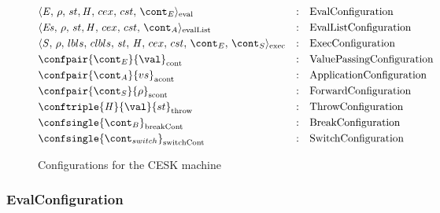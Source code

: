 \documentclass{article}
\begin{document}
\newcommand{\breakconf}[1]{\confsingle{#1}_{\mathrm{breakCont}}}
\newcommand{\switchconf}[1]{\confsingle{#1}_{\mathrm{switchCont}}}
\newcommand{\contconf}[2]{\confpair{#1}{#2}_{\mathrm{cont}}}
\newcommand{\scontconf}[2]{\confpair{#1}{#2}_{\mathrm{scont}}}
\newcommand{\acontconf}[2]{\confpair{#1}{#2}_{\mathrm{acont}}}
\newcommand{\throwconf}[3]{\conftriple{#1}{#2}{#3}_{\mathrm{throw}}}
\newcommand{\evallistconf}[6]{\langle{#1},\,{#2},\,{#3},\handler,\,{#4},\,{#5},\,{#6}\rangle_{\mathrm{evalList}}}
\newcommand{\evalconf}[6]{\langle{#1},\,{#2},\,{#3},\handler,\,{#4},\,{#5},\,{#6}\rangle_{\mathrm{eval}}}
\newcommand{\execconf}[9]{\langle{#1},\,{#2},\,{#3},\,{#4},\,\strace,\,{#5},\,{#6},\,{#7},\,{#8},\,{#9}\rangle_{\mathrm{exec}}}

\begin{figure}[Htp]
  \begin{align}
	&\evalconf{\expr}{\env}{st}{cex}{cst}{\econt} & :\quad & \text{EvalConfiguration} \label{config:eval}\\
	&\evallistconf{\exprs}{\env}{st}{cex}{cst}{\acont} & :\quad & \text{EvalListConfiguration} \label{config:evallist}\\
	&\execconf{\stmt}{\env}{\lbls}{\clbls}{\handler}{\cex}{\cstrace}{\econt}{\scont}  & :\quad & \text{ExecConfiguration} \label{config:exec}\\
	&\contconf{\econt}{\val} & :\quad & \text{ValuePassingConfiguration} \label{config:econt}\\
	&\acontconf{\acont}{\vals} & :\quad & \text{ApplicationConfiguration} \label{config:acont}\\
	&\scontconf{\scont}{\env} & :\quad & \text{ForwardConfiguration} \label{config:scont}\\
	&\throwconf{\handler}{\val}{\strace} & :\quad & \text{ThrowConfiguration} \label{config:throw}\\
	&\breakconf{\bcont} & :\quad & \text{BreakConfiguration} \label{config:bcont}\\
	&\switchconf{\switchcont} & :\quad &
	\text{SwitchConfiguration}
	\label{config:switchcont}
  \end{align}
  \caption{Configurations for the CESK machine}
\end{figure}

\subsubsection{EvalConfiguration}
\label{subsubsec:evalconfig}
\end{document}

